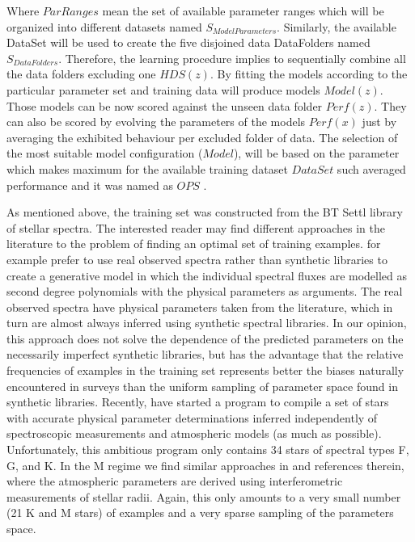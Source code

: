 Where $ParRanges$ mean the set of available parameter ranges which will be
organized into different datasets named $S_{ModelParameters}$.
Similarly, the available DataSet will be used to create the five disjoined data DataFolders
named $S_{DataFolders}$. Therefore, the learning procedure implies to 
sequentially combine all the data folders excluding one $HDS(z)$. 
By fitting the models according to the particular parameter 
set and training data will produce models $Model(z)$. Those models can be now scored
against the unseen data folder $Perf(z)$.
They can also be scored by evolving the parameters of the models $Perf(x)$ just by
averaging the exhibited behaviour per excluded folder of data.
The selection of the most suitable model configuration ($Model$), will be based on the parameter
which makes maximum for the available training dataset $DataSet$
such averaged performance and it was named as $OPS$ .

As mentioned above, the training set was constructed from the BT Settl
library of stellar spectra. The interested reader may find different
approaches in the literature to the problem of finding an optimal set
of training examples. \cite{hoggCannon} for example prefer to use real
observed spectra rather than synthetic libraries to create a
generative model in which the individual spectral fluxes are modelled
as second degree polynomials with the physical parameters as
arguments. The real observed spectra have physical parameters taken
from the literature, which in turn are almost always inferred using
synthetic spectral libraries. In our opinion, this approach does not
solve the dependence of the predicted parameters on the necessarily
imperfect synthetic libraries, but has the advantage that the relative
frequencies of examples in the training set represents better the
biases naturally encountered in surveys than the uniform sampling of
parameter space found in synthetic libraries. Recently, \cite{heiter}
have started a program to compile a set of stars with accurate
physical parameter determinations inferred independently of
spectroscopic measurements and atmospheric models (as much as
possible). Unfortunately, this ambitious program only contains 34
stars of spectral types F, G, and K. In the M regime we find similar
approaches in \cite{2014AJ....147...47B} and references therein, where
the atmospheric parameters are derived using interferometric
measurements of stellar radii. Again, this only amounts to a very
small number (21 K and M stars) of examples and a very sparse sampling
of the parameters space.

